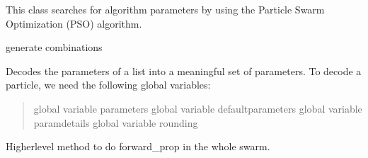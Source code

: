 \documentclass[letterpaper,10pt,english]{sphinxmanual}
\begin{document}
\begin{fulllineitems}
\label{\detokenize{index:pspso.pspso}}
This class searches for algorithm parameters by using the Particle Swarm Optimization (PSO) algorithm.

\begin{fulllineitems}
\label{\detokenize{index:pspso.pspso.calculatecombinations}}
generate combinations

\end{fulllineitems}


\begin{fulllineitems}
\label{\detokenize{index:pspso.pspso.decode_parameters}}
Decodes the parameters of a list into a meaningful set of parameters.
To decode a particle, we need the following global variables:
\begin{quote}

global variable parameters
global variable defaultparameters
global variable paramdetails
global variable rounding
\end{quote}

\end{fulllineitems}


\begin{fulllineitems}
\label{\detokenize{index:pspso.pspso.f}}
Higher\sphinxhyphen{}level method to do forward\_prop in the
whole swarm.


\end{fulllineitems}
\end{fulllineitems}
\end{document}
